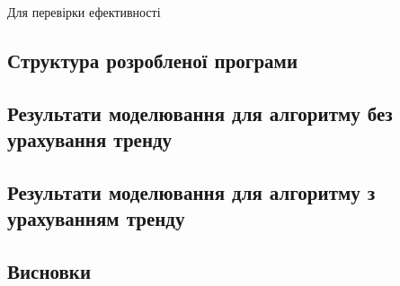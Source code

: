 \newpage
{}
    Для перевірки ефективності \TBD
\subsection{Структура розробленої програми}
    \TBD

\subsection{Результати моделювання для алгоритму без урахування тренду}
    \TBD
\subsection{Результати моделювання для алгоритму з урахуванням тренду}
    \TBD
\newpage
\subsection*{Висновки}
    \TBD
